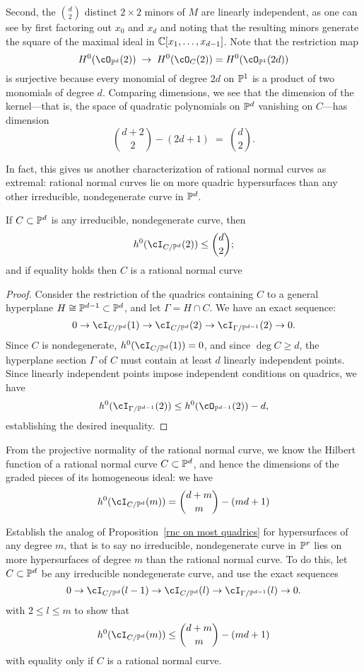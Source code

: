 Second, the ${d\choose 2}$ distinct $2\times 2$ minors of $M$ are linearly independent, as one can see by first factoring out $x_0$ and $x_d$ and noting that the resulting minors generate the square of the maximal ideal in $\CC[x_1,\dots, x_{d-1}]$. Note that
the restriction map
$$
H^0(\cO_{\PP^d}(2)) \; \to \; H^0(\cO_{C}(2)) = H^0(\cO_{\PP^1}(2d))
$$
 is surjective  because every monomial of degree $2d$ on $\PP^1$ is a product of two monomials of degree $d$. Comparing dimensions, we see that the dimension of the kernel---that is, the space of quadratic polynomials on $\PP^d$ vanishing on $C$---has dimension
$$
\binom{d+2}{2} - (2d+1) \; = \; \binom{d}{2}.
$$


In fact, this gives us another characterization of rational normal curves as extremal: rational normal curves lie on more quadric hypersurfaces than any other irreducible, nondegenerate curve in $\PP^d$.

\begin{proposition}\label{rnc on most quadrics}
If $C \subset \PP^d$ is any irreducible, nondegenerate curve, then
$$
h^0(\cI_{C/\PP^d}(2)) \leq  \binom{d}{2};
$$
and if equality holds then $C$ is a rational normal curve
\end{proposition}

\begin{proof}
Consider the restriction of the quadrics containing $C$ to a general hyperplane $H \cong \PP^{d-1} \subset \PP^d$, and let $\Gamma = H \cap C$. We have an exact sequence:
$$
0 \to \cI_{C/\PP^d}(1) \to \cI_{C/\PP^d}(2) \to \cI_{\Gamma/\PP^{d-1}}(2) \to 0.
$$ 
Since $C$ is nondegenerate, $h^0(\cI_{C/\PP^d}(1)) = 0$, and since $\deg C \geq d$, the hyperplane section $\Gamma$ of $C$ must contain at least $d$ linearly independent points. Since linearly independent points impose independent conditions on quadrics, we have
$$
h^0(\cI_{\Gamma/\PP^{d-1}}(2)) \leq h^0(\cO_{\PP^{d-1}}(2)) - d,
$$
establishing the desired inequality.
\end{proof}

From the projective normality of the rational normal curve, we know the Hilbert function of a rational normal curve $C \subset \PP^d$, and hence the dimensions of the graded pieces of its homogeneous ideal: we have
$$
h^0(\cI_{C/\PP^d}(m)) =  \binom{d+m}{m} - (md+1)
$$

\begin{exercise}
Establish the analog of Proposition~\ref{rnc on most quadrics} for hypersurfaces of any degree $m$, that is to say no irreducible, nondegenerate curve in $\PP^r$ lies on more hypersurfaces of degree $m$ than the rational normal curve.
To do this, let $C\subset \PP^d$ be any irreducible nondegenerate curve, and use the exact sequences
$$
0 \to \cI_{C/\PP^d}(l-1) \to \cI_{C/\PP^d}(l) \to \cI_{\Gamma/\PP^{d-1}}(l) \to 0.
$$ 
with $2 \leq l \leq m$ to show that
$$
h^0(\cI_{C/\PP^d}(m)) \leq  \binom{d+m}{m} - (md+1)
$$
with equality only if $C$ is a rational normal curve.
\end{exercise}

